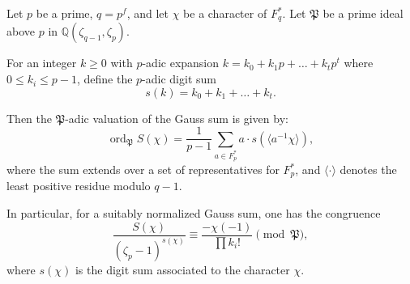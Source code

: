 Let $p$ be a prime, $q = p^f$, and let $\chi$ be a character of $F_q^*$. Let $\mathfrak{P}$ be a prime ideal above $p$ in $\mathbb{Q}(\zeta_{q-1}, \zeta_p)$.

For an integer $k \geq 0$ with $p$-adic expansion $k = k_0 + k_1 p + \dots + k_t p^t$ where $0 \leq k_i \leq p-1$, define the $p$-adic digit sum
$$s(k) = k_0 + k_1 + \dots + k_t.$$

Then the $\mathfrak{P}$-adic valuation of the Gauss sum is given by:
$$\operatorname{ord}_{\mathfrak{P}} S(\chi) = \frac{1}{p-1} \sum_{a \in F_p^*} a \cdot s\left( \langle a^{-1} \chi \rangle \right),$$
where the sum extends over a set of representatives for $F_p^*$, and $\langle \cdot \rangle$ denotes the least positive residue modulo $q-1$.

In particular, for a suitably normalized Gauss sum, one has the congruence
$$\frac{S(\chi)}{(\zeta_p - 1)^{s(\chi)}} \equiv \frac{-\chi(-1)}{\prod k_i!} \pmod{\mathfrak{P}},$$
where $s(\chi)$ is the digit sum associated to the character $\chi$.
